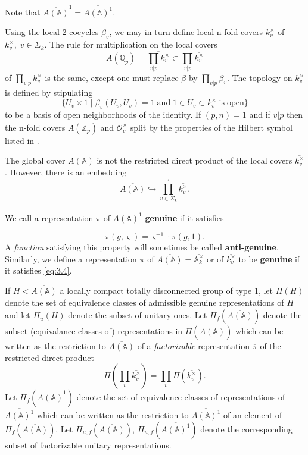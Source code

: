 Note that
$\overline{A({\mathbb{A}})}^1=\overline{A({\mathbb{A}})^1}$.

Using the local 2-cocycles $\beta _v$, we may in turn define local n-fold
covers $\overline{k_v^{\times }}$ of $k_v^{\times },\;v\in \Sigma _k$. The
rule for multiplication on the local covers
\[
\overline{A({\mathbb{Q}}_p)}=
\overline{\prod_{v|p}k_v^{\times }}
\subset \prod_{v|p}
\overline{k_v^{\times }}
\]
of $\prod_{v|p}k_v^{\times }$ is the same, except one must
replace $\beta $ by $\prod_{v|p}\beta _v$. The topology on
$\overline{k_v^{\times }}$
is defined by stipulating 
\[
\{U_v\times 1\;|\;\beta _v(U_v,U_v)=1\;\mathrm{and}\;1\in U_v\subset
k_v^{\times }\;\mathrm{is\;open}\}
\]
to be a basis of open neighborhoods of the identity.
If $(p,n)=1$ and if $v|p$ then the n-fold covers
$\overline{A(\mathbb{Z}_p)}$ and
$\overline{{\mathcal{O}}_v^{\times }}$ split by
the properties of the Hilbert symbol listed in \cite[section XIII.5]{W1}.

The global cover $\overline{A({\mathbb{A}})}$ is not the restricted direct
product of the local covers $\overline{k_v^{\times }}$. However, there is an
embedding 
\[
\overline{A({\mathbb{A}})}\hookrightarrow
\prod_{v\in \Sigma _k}^{\prime }\overline{k_v^{\times }}.
\]

We call a representation $\pi $ of $\overline{A({\mathbb{A}})^1}$
\textbf{genuine} if it satisfies

\begin{equation}\label{eq:3.4}
\pi (g,\varsigma )=\varsigma^{-1} \cdot \pi (g,1).
\end{equation}
A {\em function} satisfying this property will sometimes be
called {\bf anti-genuine}.
Similarly, we define a representation $\pi $ of
$\overline{A({\mathbb{A}})}=\overline{{\mathbb{A}}_k^{\times }}$ or
of $\overline{k_v^{\times }}$ to be 
\textbf{genuine} if it satisfies \eqref{eq:3.4}.

If $H<\overline{A({\mathbb{A}})}$ a locally compact totally disconnected group
of type 1, let $\Pi (H)$ denote
the set of equivalence classes of admissible genuine
representations of $H$ and
let $\Pi_u(H)$ denote the subset of unitary ones.
Let $\Pi_f (\overline{A({\mathbb{A}})})$
denote the subset (equivalance classes of) representations in
$\Pi(\overline{A({\mathbb{A}})})$ which can be written as the
restriction to $\overline{A({\mathbb{A}})}$
of a {\em factorizable} representation $\overline{\pi }$
of the restricted direct product 
\[
\Pi (\prod_v\overline{k_v^{\times }})=\prod_v
\Pi (\overline{k_v^{\times }}).
\]
Let $\Pi_f (\overline{A({\mathbb{A}})}^1)$ denote the
set of equivalence classes of
representations of $\overline{A({\mathbb{A}})^1}$ which can be written as the
restriction to $\overline{A({\mathbb{A}})^1}$ of an element of
$\Pi_f (\overline{A({\mathbb{A}})})$.
Let $\Pi_{u,f} (\overline{A({\mathbb{A}})})$,
$\Pi_{u,f} (\overline{A({\mathbb{A}})^1})$
denote the corresponding subset of factorizable unitary representations.

